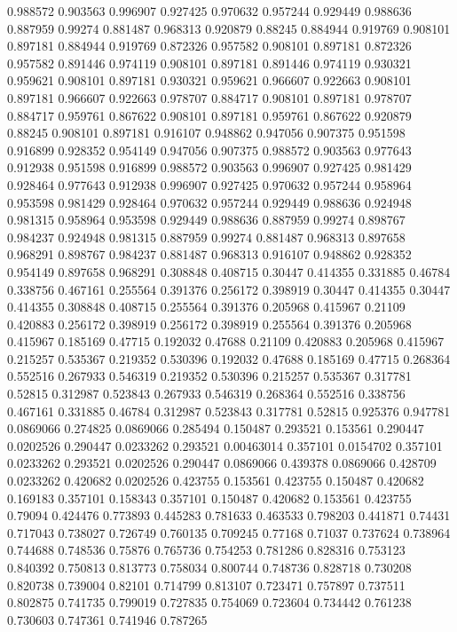 0.988572 0.903563
0.996907 0.927425
0.970632 0.957244
0.929449 0.988636
0.887959 0.99274
0.881487 0.968313
0.920879 0.88245
0.884944 0.919769
0.908101 0.897181
0.884944 0.919769
0.872326 0.957582
0.908101 0.897181
0.872326 0.957582
0.891446 0.974119
0.908101 0.897181
0.891446 0.974119
0.930321 0.959621
0.908101 0.897181
0.930321 0.959621
0.966607 0.922663
0.908101 0.897181
0.966607 0.922663
0.978707 0.884717
0.908101 0.897181
0.978707 0.884717
0.959761 0.867622
0.908101 0.897181
0.959761 0.867622
0.920879 0.88245
0.908101 0.897181
0.916107 0.948862
0.947056 0.907375
0.951598 0.916899
0.928352 0.954149
0.947056 0.907375
0.988572 0.903563
0.977643 0.912938
0.951598 0.916899
0.988572 0.903563
0.996907 0.927425
0.981429 0.928464
0.977643 0.912938
0.996907 0.927425
0.970632 0.957244
0.958964 0.953598
0.981429 0.928464
0.970632 0.957244
0.929449 0.988636
0.924948 0.981315
0.958964 0.953598
0.929449 0.988636
0.887959 0.99274
0.898767 0.984237
0.924948 0.981315
0.887959 0.99274
0.881487 0.968313
0.897658 0.968291
0.898767 0.984237
0.881487 0.968313
0.916107 0.948862
0.928352 0.954149
0.897658 0.968291
0.308848 0.408715
0.30447 0.414355
0.331885 0.46784
0.338756 0.467161
0.255564 0.391376
0.256172 0.398919
0.30447 0.414355
0.30447 0.414355
0.308848 0.408715
0.255564 0.391376
0.205968 0.415967
0.21109 0.420883
0.256172 0.398919
0.256172 0.398919
0.255564 0.391376
0.205968 0.415967
0.185169 0.47715
0.192032 0.47688
0.21109 0.420883
0.205968 0.415967
0.215257 0.535367
0.219352 0.530396
0.192032 0.47688
0.185169 0.47715
0.268364 0.552516
0.267933 0.546319
0.219352 0.530396
0.215257 0.535367
0.317781 0.52815
0.312987 0.523843
0.267933 0.546319
0.268364 0.552516
0.338756 0.467161
0.331885 0.46784
0.312987 0.523843
0.317781 0.52815
0.925376 0.947781
0.0869066 0.274825
0.0869066 0.285494
0.150487 0.293521
0.153561 0.290447
0.0202526 0.290447
0.0233262 0.293521
0.00463014 0.357101
0.0154702 0.357101
0.0233262 0.293521
0.0202526 0.290447
0.0869066 0.439378
0.0869066 0.428709
0.0233262 0.420682
0.0202526 0.423755
0.153561 0.423755
0.150487 0.420682
0.169183 0.357101
0.158343 0.357101
0.150487 0.420682
0.153561 0.423755
0.79094 0.424476
0.773893 0.445283
0.781633 0.463533
0.798203 0.441871
0.74431 0.717043
0.738027 0.726749
0.760135 0.709245
0.77168 0.71037
0.737624 0.738964
0.744688 0.748536
0.75876 0.765736
0.754253 0.781286
0.828316 0.753123
0.840392 0.750813
0.813773 0.758034
0.800744 0.748736
0.828718 0.730208
0.820738 0.739004
0.82101 0.714799
0.813107 0.723471
0.757897 0.737511
0.802875 0.741735
0.799019 0.727835
0.754069 0.723604
0.734442 0.761238
0.730603 0.747361
0.741946 0.787265
